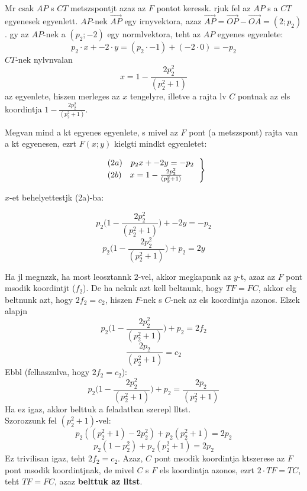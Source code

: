 \documentclass[a4paper,oneside]{book}
\begin{document}
Mr csak $AP$ s $CT$ metszspontjt azaz az $F$ pontot keressk. rjuk fel az $AP$ s a $CT$ egyenesek egyenlett. $AP$-nek $\overrightarrow{AP}$ egy irnyvektora, azaz $\overrightarrow{AP} = \overrightarrow{OP}-\overrightarrow{OA} = (2; p_2)$. gy az $AP$-nek a $(p_2; -2)$ egy normlvektora, teht az $AP$ egyenes egyenlete:
\[p_2\cdot x + -2\cdot y = (p_2\cdot -1)+(-2\cdot 0) = -p_2\]
$CT$-nek nylvnvalan
\[x = 1-\frac{2p_2^2}{(p_2^2+1)}\]
az egyenlete, hiszen merleges az $x$ tengelyre, illetve a rajta lv $C$ pontnak az els koordintja $1-\frac{2p_2^2}{(p_2^2+1)}$.

Megvan mind a kt egyenes egyenlete, s mivel az $F$ pont (a metszspont) rajta van a kt egyenesen, ezrt $F(x;y)$ kielgti mindkt egyenletet:

\[\left.\begin{tabular}{ll}
$(2a) \quad p_2x + -2y = -p_2$\\
$(2b) \quad x = 1-\frac{2p_2^2}{(p_2^2+1)}$
\end{tabular}\right\}\]

$x$-et behelyettestjk (2a)-ba:

\[p_2\Big(1-\frac{2p_2^2}{(p_2^2+1)}\Big) + -2y = -p_2\]
\[p_2\Big(1-\frac{2p_2^2}{(p_2^2+1)}\Big) + p_2 = 2y\]

Ha jl megnzzk, ha most leosztannk 2-vel, akkor megkapnnk az $y$-t, azaz az $F$ pont msodik koordintjt ($f_2$). De ha neknk azt kell beltnunk, hogy $TF=FC$, akkor elg beltnunk azt, hogy $2f_2=c_2$, hiszen $F$-nek s $C$-nek az els koordintja azonos. Elzek alapjn
\[p_2\Big(1-\frac{2p_2^2}{(p_2^2+1)}\Big) + p_2 = 2f_2\]
\[\frac{2p_2}{(p_2^2+1)} = c_2\]
Ebbl (felhasznlva, hogy $2f_2=c_2$):
\[p_2\Big(1-\frac{2p_2^2}{(p_2^2+1)}\Big) + p_2 = \frac{2p_2}{(p_2^2+1)}\]
Ha ez igaz, akkor belttuk a feladatban szerepl lltst.\\
Szorozzunk fel $(p_2^2+1)$-vel:
\[p_2((p_2^2+1)-2p_2^2) + p_2(p_2^2+1) = 2p_2\]
\[p_2(1-p_2^2) + p_2(p_2^2+1) = 2p_2\]
Ez trivilisan igaz, teht $2f_2=c_2$. Azaz, $C$ pont msodik koordintja ktszerese az $F$ pont msodik koordintjnak, de mivel $C$ s $F$ els koordintja azonos, ezrt $2\cdot TF=TC$, teht $TF=FC$, azaz \textbf{belttuk az lltst}.
\end{document}
